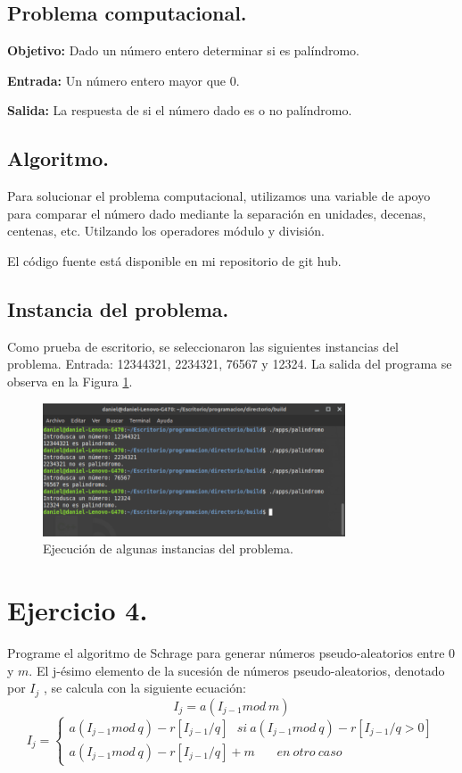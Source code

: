 \documentclass[12pt,letterpaper]{article}
\begin{document}
{\subsection{Problema computacional.}
\textbf{Objetivo:} Dado un n\'umero entero determinar si es pal\'indromo.

\textbf{Entrada:} Un n\'umero entero mayor que 0.

\textbf{Salida:} La respuesta de si el n\'umero dado es o no pal\'indromo.

\subsection{Algoritmo.}
Para solucionar el problema computacional, utilizamos una variable de apoyo para comparar el n\'umero dado mediante la separaci\'on en unidades, decenas, centenas, etc. Utilzando los operadores m\'odulo y divisi\'on.


El código fuente está disponible en mi repositorio de git hub. \cite{url:palindromo}

\subsection{Instancia del problema.}
Como prueba de escritorio, se seleccionaron las siguientes instancias del problema. Entrada: 12344321, 2234321, 76567 y 12324. La salida del programa se observa en la Figura \ref{fig:palindromo}.
\begin{figure}[ht!]
  \centering
  \includegraphics[width=0.8\textwidth]{figures/palindromo}
  \caption{Ejecución de algunas instancias del problema.}
  \label{fig:palindromo}
\end{figure}

\section{Ejercicio 4.}

Programe el algoritmo de Schrage para generar n\'umeros pseudo-aleatorios
entre $0$ y $m$.
El j-\'esimo elemento de la sucesi\'on de n\'umeros pseudo-aleatorios, denotado por $I_j$ , se calcula con la siguiente ecuaci\'on:
$$ I_j = a(I_{j-1} mod \ m) $$
$$I_{j}=\left\lbrace\begin{array}{c} a(I_{j-1} mod \ q)-r[I_{j-1} /q] \ \ \ si \ a(I_{j-1} mod \ q )-r[I_{j-1}/q > 0] \\ a(I_{j-1} mod \ q)-r[I_{j-1} /q] + m \ \ \ \ \ \ \ \ en \ otro \ caso \ \ \ \ \ \ \ \ \  \ \ \ \ \ \end{array}\right.  $$

}
\end{document}
